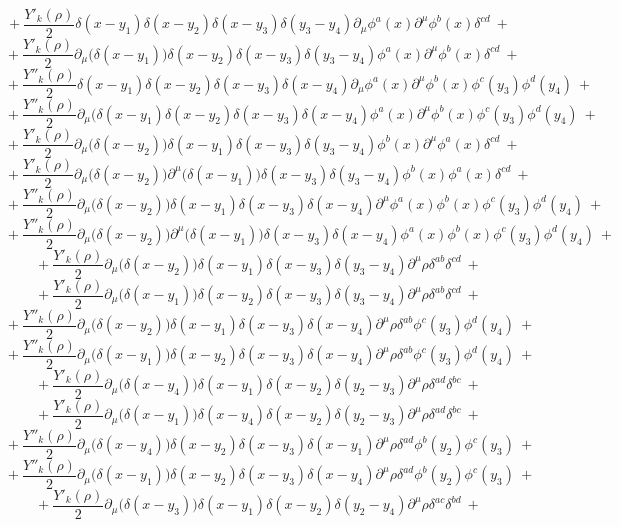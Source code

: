 $$+\ \frac{Y'_k(\rho)}{2}\delta(x - y_1)\delta(x - y_2)\delta(x - y_3)\delta(y_3 - y_4)\partial_\mu\phi^a(x)\partial^\mu\phi^b(x)\delta^{cd} \ +$$
$$+\ \frac{Y'_k(\rho)}{2}\partial_\mu\big(\delta(x - y_1)\big)\delta(x - y_2)\delta(x - y_3)\delta(y_3 - y_4)\phi^a(x)\partial^\mu\phi^b(x)\delta^{cd} \ +$$
$$+\ \frac{Y''_k(\rho)}{2}\delta(x - y_1)\delta(x - y_2)\delta(x - y_3)\delta(x - y_4)\partial_\mu\phi^a(x)\partial^\mu\phi^b(x)\phi^c(y_3)\phi^d(y_4) \ +$$
$$+\ \frac{Y''_k(\rho)}{2}\partial_\mu\big(\delta(x - y_1)\delta(x - y_2)\delta(x - y_3)\delta(x - y_4)\phi^a(x)\partial^\mu\phi^b(x)\phi^c(y_3)\phi^d(y_4) \ +$$
$$+\ \frac{Y'_k(\rho)}{2}\partial_\mu\big(\delta(x - y_2)\big)\delta(x - y_1)\delta(x - y_3)\delta(y_3 - y_4)\phi^b(x)\partial^\mu\phi^a(x)\delta^{cd} \ +$$
$$+\ \frac{Y'_k(\rho)}{2}\partial_\mu\big(\delta(x - y_2)\big)\partial^\mu\big(\delta(x - y_1)\big)\delta(x - y_3)\delta(y_3 - y_4)\phi^b(x)\phi^a(x)\delta^{cd} \ +$$
$$+\ \frac{Y''_k(\rho)}{2}\partial_\mu\big(\delta(x - y_2)\big)\delta(x - y_1)\delta(x - y_3)\delta(x - y_4)\partial^\mu\phi^a(x)\phi^b(x)\phi^c(y_3)\phi^d(y_4) \ +$$
$$+\ \frac{Y''_k(\rho)}{2}\partial_\mu\big(\delta(x - y_2)\big)\partial^\mu\big(\delta(x - y_1)\big)\delta(x - y_3)\delta(x - y_4)\phi^a(x)\phi^b(x)\phi^c(y_3)\phi^d(y_4) \ +$$
$$+\ \frac{Y'_k(\rho)}{2}\partial_\mu\big(\delta(x - y_2)\big)\delta(x - y_1)\delta(x - y_3)\delta(y_3 - y_4)\partial^\mu\rho \delta^{ab}\delta^{cd} \ +$$
$$+\ \frac{Y'_k(\rho)}{2}\partial_\mu\big(\delta(x - y_1)\big)\delta(x - y_2)\delta(x - y_3)\delta(y_3 - y_4)\partial^\mu\rho \delta^{ab}\delta^{cd} \ +$$
$$+\ \frac{Y''_k(\rho)}{2}\partial_\mu\big(\delta(x - y_2)\big)\delta(x - y_1)\delta(x - y_3)\delta(x - y_4)\partial^\mu\rho \delta^{ab}\phi^c(y_3)\phi^d(y_4) \ +$$
$$+\ \frac{Y''_k(\rho)}{2}\partial_\mu\big(\delta(x - y_1)\big)\delta(x - y_2)\delta(x - y_3)\delta(x - y_4)\partial^\mu\rho \delta^{ab}\phi^c(y_3)\phi^d(y_4) \ +$$
$$+\ \frac{Y'_k(\rho)}{2}\partial_\mu\big(\delta(x - y_4)\big)\delta(x - y_1)\delta(x - y_2)\delta(y_2 - y_3)\partial^\mu\rho \delta^{ad}\delta^{bc} \ +$$
$$+\ \frac{Y'_k(\rho)}{2}\partial_\mu\big(\delta(x - y_1)\big)\delta(x - y_4)\delta(x - y_2)\delta(y_2 - y_3)\partial^\mu\rho \delta^{ad}\delta^{bc} \ +$$
$$+\ \frac{Y''_k(\rho)}{2}\partial_\mu\big(\delta(x - y_4)\big)\delta(x - y_2)\delta(x - y_3)\delta(x - y_1)\partial^\mu\rho \delta^{ad}\phi^b(y_2)\phi^c(y_3) \ +$$
$$+\ \frac{Y''_k(\rho)}{2}\partial_\mu\big(\delta(x - y_1)\big)\delta(x - y_2)\delta(x - y_3)\delta(x - y_4)\partial^\mu\rho \delta^{ad}\phi^b(y_2)\phi^c(y_3) \ +$$
$$+\ \frac{Y'_k(\rho)}{2}\partial_\mu\big(\delta(x - y_3)\big)\delta(x - y_1)\delta(x - y_2)\delta(y_2 - y_4)\partial^\mu\rho \delta^{ac}\delta^{bd} \ +$$
